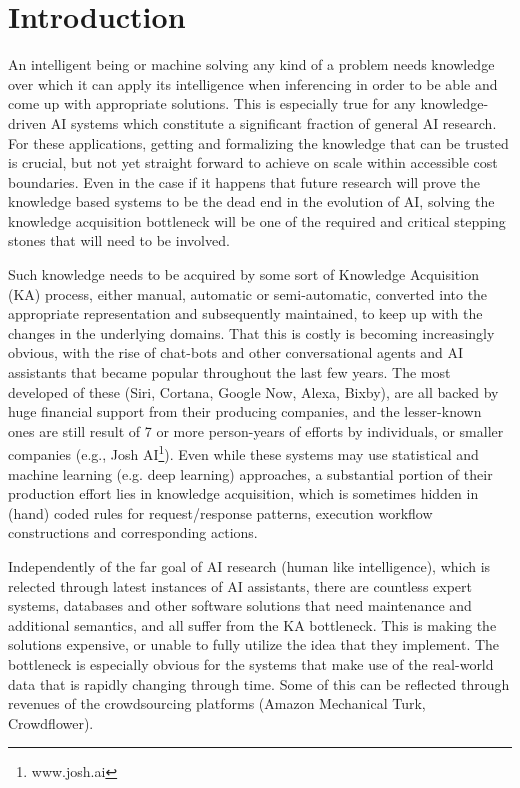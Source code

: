% 
\chapter{Introduction}
An intelligent being or machine solving any kind of a problem needs knowledge 
over which it can apply its intelligence when inferencing in order to be able
and come up with appropriate solutions. This is especially true for any 
knowledge-driven AI systems which constitute a significant fraction of general 
AI research. For these applications, getting and formalizing the knowledge that
can be trusted is crucial, but not yet straight forward to achieve on scale 
within accessible cost boundaries. Even in the case if it happens that future 
research will prove the knowledge based systems to be the dead end in the
evolution of AI, solving the knowledge acquisition bottleneck will be one of
the required and critical stepping stones that will need to be involved.

Such knowledge needs to be acquired by some sort of Knowledge Acquisition (KA) 
process, either manual, automatic or semi-automatic, converted into the
appropriate representation and subsequently maintained, to keep up with the
changes in the underlying domains. That this is costly is becoming 
increasingly obvious, with the rise of chat-bots and other conversational 
agents and AI assistants that became popular throughout the last few years. 
The most developed of these (Siri, Cortana, Google Now, Alexa, Bixby), are 
all backed by huge financial support from their producing companies, and the 
lesser-known ones are still result of 7 or more person-years of efforts by
individuals\parencite{Wilcox2011, Wallace2013}, or smaller companies (e.g.,
Josh AI\footnote{www.josh.ai}). Even while these systems may use statistical
and machine learning (e.g. deep learning) approaches, a substantial 
portion of their production effort lies in knowledge acquisition, which is 
sometimes hidden in (hand) coded rules for request/response patterns, execution
workflow constructions and corresponding actions.

Independently of the far goal of AI research (human like intelligence), which
is relected through latest instances of AI assistants, there are countless 
expert systems, databases and other software solutions that need maintenance
and additional semantics, and all suffer from the KA bottleneck. This is making
the solutions expensive, or unable to fully utilize the idea that they 
implement. The bottleneck is especially obvious for the systems that make use 
of the real-world data that is rapidly changing through time. Some of this can
be reflected through revenues of the crowdsourcing platforms (Amazon Mechanical
Turk, Crowdflower).

